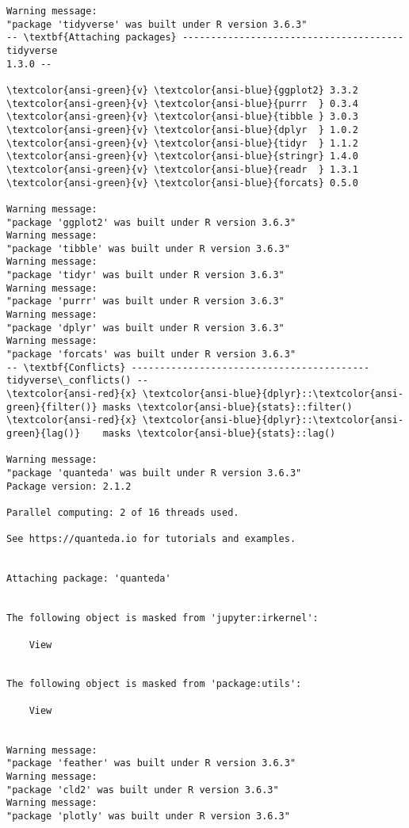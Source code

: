 \documentclass[11pt]{article}
\begin{document}
    \begin{Verbatim}[commandchars=\\\{\}]
Warning message:
"package 'tidyverse' was built under R version 3.6.3"
-- \textbf{Attaching packages} --------------------------------------- tidyverse
1.3.0 --

\textcolor{ansi-green}{v} \textcolor{ansi-blue}{ggplot2} 3.3.2     \textcolor{ansi-green}{v} \textcolor{ansi-blue}{purrr  } 0.3.4
\textcolor{ansi-green}{v} \textcolor{ansi-blue}{tibble } 3.0.3     \textcolor{ansi-green}{v} \textcolor{ansi-blue}{dplyr  } 1.0.2
\textcolor{ansi-green}{v} \textcolor{ansi-blue}{tidyr  } 1.1.2     \textcolor{ansi-green}{v} \textcolor{ansi-blue}{stringr} 1.4.0
\textcolor{ansi-green}{v} \textcolor{ansi-blue}{readr  } 1.3.1     \textcolor{ansi-green}{v} \textcolor{ansi-blue}{forcats} 0.5.0

Warning message:
"package 'ggplot2' was built under R version 3.6.3"
Warning message:
"package 'tibble' was built under R version 3.6.3"
Warning message:
"package 'tidyr' was built under R version 3.6.3"
Warning message:
"package 'purrr' was built under R version 3.6.3"
Warning message:
"package 'dplyr' was built under R version 3.6.3"
Warning message:
"package 'forcats' was built under R version 3.6.3"
-- \textbf{Conflicts} ------------------------------------------
tidyverse\_conflicts() --
\textcolor{ansi-red}{x} \textcolor{ansi-blue}{dplyr}::\textcolor{ansi-green}{filter()} masks \textcolor{ansi-blue}{stats}::filter()
\textcolor{ansi-red}{x} \textcolor{ansi-blue}{dplyr}::\textcolor{ansi-green}{lag()}    masks \textcolor{ansi-blue}{stats}::lag()

Warning message:
"package 'quanteda' was built under R version 3.6.3"
Package version: 2.1.2

Parallel computing: 2 of 16 threads used.

See https://quanteda.io for tutorials and examples.


Attaching package: 'quanteda'


The following object is masked from 'jupyter:irkernel':

    View


The following object is masked from 'package:utils':

    View


Warning message:
"package 'feather' was built under R version 3.6.3"
Warning message:
"package 'cld2' was built under R version 3.6.3"
Warning message:
"package 'plotly' was built under R version 3.6.3"


\end{Verbatim}
\end{document}
